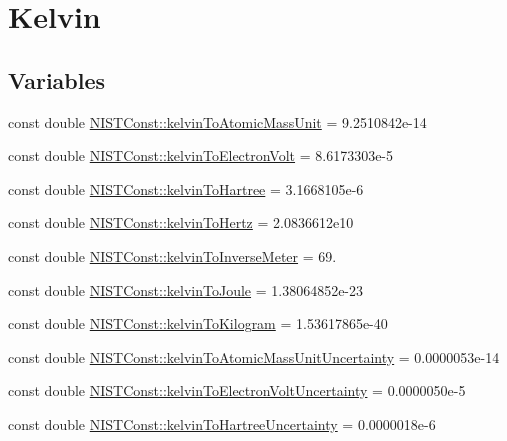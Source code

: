 \hypertarget{group___n_i_s_t_const-_kelvin}{}\section{Kelvin}
\label{group___n_i_s_t_const-_kelvin}
\subsection*{Variables}
\begin{DoxyCompactItemize}
\item 
const double \hyperlink{group___n_i_s_t_const-_kelvin_gadad57a8f65f4d323846c97fbe0c485b1}{N\+I\+S\+T\+Const\+::kelvin\+To\+Atomic\+Mass\+Unit} = 9.\+2510842e-\/14
\item 
const double \hyperlink{group___n_i_s_t_const-_kelvin_gae61d97fa154d94e710c951a26bd47896}{N\+I\+S\+T\+Const\+::kelvin\+To\+Electron\+Volt} = 8.\+6173303e-\/5
\item 
const double \hyperlink{group___n_i_s_t_const-_kelvin_gaece5622592a7f817204ca28c6d00d570}{N\+I\+S\+T\+Const\+::kelvin\+To\+Hartree} = 3.\+1668105e-\/6
\item 
const double \hyperlink{group___n_i_s_t_const-_kelvin_gaa426666c20c9b04efcdcfd05f5a90cd9}{N\+I\+S\+T\+Const\+::kelvin\+To\+Hertz} = 2.\+0836612e10
\item 
const double \hyperlink{group___n_i_s_t_const-_kelvin_ga361938b994609879a0377a94e49dacf2}{N\+I\+S\+T\+Const\+::kelvin\+To\+Inverse\+Meter} = 69.
\item 
const double \hyperlink{group___n_i_s_t_const-_kelvin_gae77577280e3dd4a78d41af37076c8f8d}{N\+I\+S\+T\+Const\+::kelvin\+To\+Joule} = 1.\+38064852e-\/23
\item 
const double \hyperlink{group___n_i_s_t_const-_kelvin_gaf5fcf341c9c92f8ede2f402989ae8de1}{N\+I\+S\+T\+Const\+::kelvin\+To\+Kilogram} = 1.\+53617865e-\/40
\item 
const double \hyperlink{group___n_i_s_t_const-_kelvin_ga9a73cc5e600276756aa8054000db2a12}{N\+I\+S\+T\+Const\+::kelvin\+To\+Atomic\+Mass\+Unit\+Uncertainty} = 0.\+0000053e-\/14
\item 
const double \hyperlink{group___n_i_s_t_const-_kelvin_ga8be70ad50a3b92d35eeb830295bda75f}{N\+I\+S\+T\+Const\+::kelvin\+To\+Electron\+Volt\+Uncertainty} = 0.\+0000050e-\/5
\item 
const double \hyperlink{group___n_i_s_t_const-_kelvin_gaf7b957ae0a4cb30b7b1f3bd5b7e8b9dd}{N\+I\+S\+T\+Const\+::kelvin\+To\+Hartree\+Uncertainty} = 0.\+0000018e-\/6
\item 

\end{DoxyCompactItemize}
